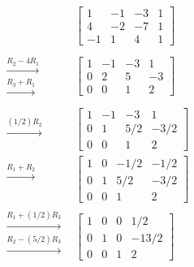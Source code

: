 \documentclass{ximera}
\begin{document}
\begin{exploration}
\begin{align}&\left[\begin{array}{ccc|c}  
 1&-1&-3&1\\4&-2&-7&1\\-1&1&4&1
 \end{array}\right]\nonumber\\
 \begin{array}{c}
\\
  \xrightarrow{R_2-4R_1}\\
\xrightarrow{R_3+R_1}\\
 \end{array}
 &\left[\begin{array}{ccc|c}  
 1&-1&-3&1\\0&2&5&-3\\0&0&1&2
 \end{array}\right]\label{eq:sys20rowechelon}\\
 \begin{array}{c}
 \\
 \xrightarrow{(1/2)R_2}\\
\\
\end{array}
&\left[\begin{array}{ccc|c}  
 1&-1&-3&1\\0&1&5/2&-3/2\\0&0&1&2
 \end{array}\right]\nonumber\\
 \begin{array}{c}
 \xrightarrow{R_1+R_2}\\
 \\
\\
\end{array}&\left[\begin{array}{ccc|c}  
 1&0&-1/2&-1/2\\0&1&5/2&-3/2\\0&0&1&2
 \end{array}\right]\nonumber\\
 \begin{array}{c}
 \xrightarrow{R_1+ (1/2)R_3}\\
 \xrightarrow{R_2- (5/2)R_3}\\
\\
\end{array}
&\left[\begin{array}{ccc|c}  
 1&0&0&1/2\\0&1&0&-13/2\\0&0&1&2
 \end{array}\right]\label{eq:sys20reducedrowechelon} 
 \end{align}


\end{exploration}
\end{document}
